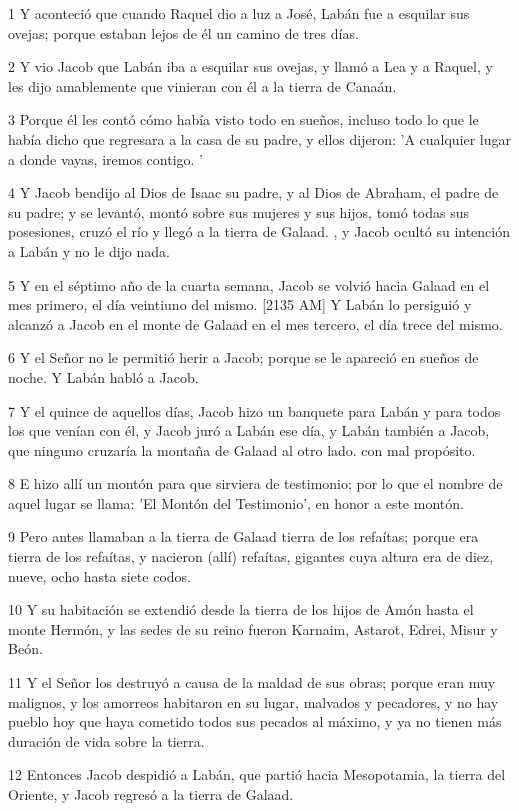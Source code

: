 \par 1 Y aconteció que cuando Raquel dio a luz a José, Labán fue a esquilar sus ovejas; porque estaban lejos de él un camino de tres días.
\par 2 Y vio Jacob que Labán iba a esquilar sus ovejas, y llamó a Lea y a Raquel, y les dijo amablemente que vinieran con él a la tierra de Canaán.
\par 3 Porque él les contó cómo había visto todo en sueños, incluso todo lo que le había dicho que regresara a la casa de su padre, y ellos dijeron: 'A cualquier lugar a donde vayas, iremos contigo. '
\par 4 Y Jacob bendijo al Dios de Isaac su padre, y al Dios de Abraham, el padre de su padre; y se levantó, montó sobre sus mujeres y sus hijos, tomó todas sus posesiones, cruzó el río y llegó a la tierra de Galaad. , y Jacob ocultó su intención a Labán y no le dijo nada.
\par 5 Y en el séptimo año de la cuarta semana, Jacob se volvió hacia Galaad en el mes primero, el día veintiuno del mismo. [2135 AM] Y Labán lo persiguió y alcanzó a Jacob en el monte de Galaad en el mes tercero, el día trece del mismo.
\par 6 Y el Señor no le permitió herir a Jacob; porque se le apareció en sueños de noche. Y Labán habló a Jacob.
\par 7 Y el quince de aquellos días, Jacob hizo un banquete para Labán y para todos los que venían con él, y Jacob juró a Labán ese día, y Labán también a Jacob, que ninguno cruzaría la montaña de Galaad al otro lado. con mal propósito.
\par 8 E hizo allí un montón para que sirviera de testimonio; por lo que el nombre de aquel lugar se llama: 'El Montón del Testimonio', en honor a este montón.
\par 9 Pero antes llamaban a la tierra de Galaad tierra de los refaítas; porque era tierra de los refaítas, y nacieron (allí) refaítas, gigantes cuya altura era de diez, nueve, ocho hasta siete codos.
\par 10 Y su habitación se extendió desde la tierra de los hijos de Amón hasta el monte Hermón, y las sedes de su reino fueron Karnaim, Astarot, Edrei, Misur y Beón.
\par 11 Y el Señor los destruyó a causa de la maldad de sus obras; porque eran muy malignos, y los amorreos habitaron en su lugar, malvados y pecadores, y no hay pueblo hoy que haya cometido todos sus pecados al máximo, y ya no tienen más duración de vida sobre la tierra.
\par 12 Entonces Jacob despidió a Labán, que partió hacia Mesopotamia, la tierra del Oriente, y Jacob regresó a la tierra de Galaad.
